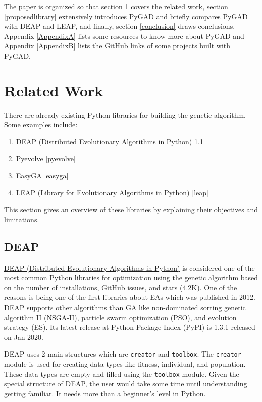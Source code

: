\documentclass[conference]{IEEEtran}
\begin{document}
The paper is organized so that section \ref{relatedwork} covers the related work, section \ref{proposedlibrary} extensively introduces PyGAD and briefly compares PyGAD with DEAP and LEAP, and finally, section \ref{conclusion} draws conclusions. Appendix \ref{AppendixA} lists some resources to know more about PyGAD and Appendix \ref{AppendixB} lists the GitHub links of some projects built with PyGAD.

\section{Related Work}
\label{relatedwork}

There are already existing Python libraries for building the genetic algorithm. Some examples include:

\begin{enumerate}[label=\Alph*]
  \item \href{https://deap.readthedocs.io}{DEAP (Distributed Evolutionary Algorithms in Python)} \ref{deap}
  \item \href{http://pyevolve.sourceforge.net}{Pyevolve} \ref{pyevolve}
  \item \href{https://github.com/danielwilczak101/EasyGA}{EasyGA} \ref{easyga}
  \item \href{https://leap-gmu.readthedocs.io/en/latest}{LEAP (Library for Evolutionary Algorithms in Python)} \ref{leap}
\end{enumerate}

This section gives an overview of these libraries by explaining their objectives and limitations.

\subsection{DEAP}
\label{deap}
\href{https://deap.readthedocs.io}{DEAP (Distributed Evolutionary Algorithms in Python)} \cite{DEAP} is considered one of the most common Python libraries for optimization using the genetic algorithm based on the number of installations, GitHub issues, and stars (4.2K). One of the reasons is being one of the first libraries about EAs which was published in 2012. DEAP supports other algorithms than GA like non-dominated sorting genetic algorithm II (NSGA-II), particle swarm optimization (PSO), and evolution strategy (ES). Its latest release at Python Package Index (PyPI) is 1.3.1 released on Jan 2020.

DEAP uses 2 main structures which are \texttt{creator} and \texttt{toolbox}. The \texttt{creator} module is used for creating data types like fitness, individual, and population. These data types are empty and filled using the \texttt{toolbox} module. Given the special structure of DEAP, the user would take some time until understanding getting familiar. It needs more than a beginner's level in Python.
\end{document}
